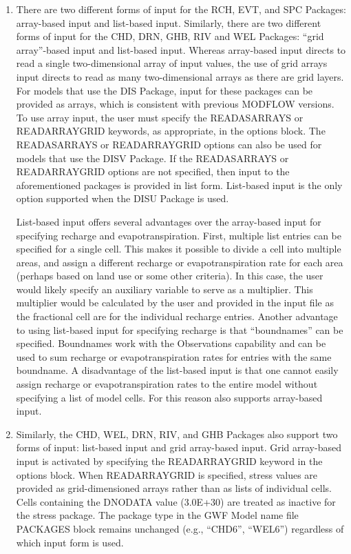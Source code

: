 \begin{enumerate}
\item There are two different forms of input for the RCH, EVT, and SPC Packages: array-based input and list-based input. Similarly, there are two different forms of input for the CHD, DRN, GHB, RIV and WEL Packages: ``grid array''-based input and list-based input.  Whereas array-based input directs \mf to read a single two-dimensional array of input values, the use of grid arrays input directs \mf to read as many two-dimensional arrays as there are grid layers.  For models that use the DIS Package, input for these packages can be provided as arrays, which is consistent with previous MODFLOW versions.  To use array input, the user must specify the READASARRAYS or READARRAYGRID keywords, as appropriate, in the options block.  The READASARRAYS or READARRAYGRID options can also be used for models that use the DISV Package.  If the READASARRAYS or READARRAYGRID options are not specified, then input to the aforementioned packages is provided in list form.  List-based input is the only option supported when the DISU Package is used.

List-based input offers several advantages over the array-based input for specifying recharge and evapotranspiration.  First, multiple list entries can be specified for a single cell.  This makes it possible to divide a cell into multiple areas, and assign a different recharge or evapotranspiration rate for each area (perhaps based on land use or some other criteria).  In this case, the user would likely specify an auxiliary variable to serve as a multiplier.  This multiplier would be calculated by the user and provided in the input file as the fractional cell are for the individual recharge entries.  Another advantage to using list-based input for specifying recharge is that ``boundnames'' can be specified.  Boundnames work with the Observations capability and can be used to sum recharge or evapotranspiration rates for entries with the same boundname.  A disadvantage of the list-based input is that one cannot easily assign recharge or evapotranspiration rates to the entire model without specifying a list of model cells.  For this reason \mf also supports array-based input.

\item Similarly, the CHD, WEL, DRN, RIV, and GHB Packages also support two forms of input: list-based input and grid array-based input.  Grid array-based input is activated by specifying the READARRAYGRID keyword in the options block.  When READARRAYGRID is specified, stress values are provided as grid-dimensioned arrays rather than as lists of individual cells.  Cells containing the DNODATA value (3.0E+30) are treated as inactive for the stress package.  The package type in the GWF Model name file PACKAGES block remains unchanged (e.g., ``CHD6'', ``WEL6'') regardless of which input form is used.


\end{enumerate}
